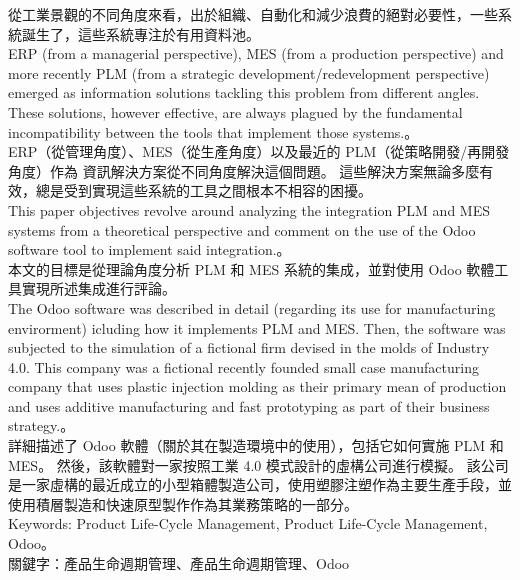 \documentclass[12pt,a4paper]{report}  %
\begin{document}
\fontsize{14pt}{5pt}\sectionef
 {從工業景觀的不同角度來看，出於組織、自動化和減少浪費的絕對必要性，一些系統誕生了，這些系統專注於有用資料池。}\\[15pt]

\fontsize{14pt}{2.5pt}\sectionef 
{ERP (from a managerial perspective), MES (from a production perspective) and more 
recently PLM (from a strategic development/redevelopment perspective) emerged as 
information solutions tackling this problem from different angles. These solutions, however 
effective, are always plagued by the fundamental incompatibility between the tools that 
implement those systems.}。\\[1pt]

\fontsize{14pt}{5pt}\sectionef
 {ERP（從管理角度）、MES（從生產角度）以及最近的 PLM（從策略開發/再開發角度）作為
資訊解決方案從不同角度解決這個問題。 這些解決方案無論多麼有效，總是受到實現這些系統的工具之間根本不相容的困擾。}\\[15pt]

\fontsize{14pt}{2.5pt}\sectionef 
{This paper objectives revolve around analyzing the integration PLM and MES systems 
from a theoretical perspective and comment on the use of the Odoo software tool to 
implement said integration.}。\\[1pt]

\fontsize{14pt}{5pt}\sectionef
 {本文的目標是從理論角度分析 PLM 和 MES 系統的集成，並對使用 Odoo 軟體工具實現所述集成進行評論。}\\[15pt]
\newpage
\fontsize{14pt}{2.5pt}\sectionef 
{The Odoo software was described in detail (regarding its use for manufacturing 
envirorment) icluding how it implements PLM and MES. Then, the software was subjected 
to the simulation of a fictional firm devised in the molds of Industry 4.0. This company was
a fictional recently founded small case manufacturing company that uses plastic injection 
molding as their primary mean of production and uses additive manufacturing and fast 
prototyping as part of their business strategy.}。\\[1pt]

\fontsize{14pt}{5pt}\sectionef
 {詳細描述了 Odoo 軟體（關於其在製造環境中的使用），包括它如何實施 PLM 和 MES。 然後，該軟體對一家按照工業 4.0 模式設計的虛構公司進行模擬。 該公司是一家虛構的最近成立的小型箱體製造公司，使用塑膠注塑作為主要生產手段，並使用積層製造和快速原型製作作為其業務策略的一部分。}\\[15pt]

\fontsize{14pt}{2.5pt}\sectionef 
{Keywords: Product Life-Cycle Management, Product Life-Cycle Management, Odoo}。\\[1pt]

\fontsize{14pt}{5pt}\sectionef
 {關鍵字：產品生命週期管理、產品生命週期管理、Odoo}\\[15pt]
\newpage

\newpage

\newpage

\newpage

\newpage
\end{document}
